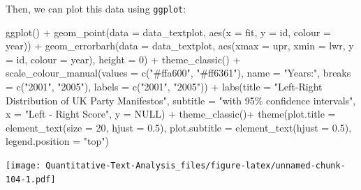 \documentclass[
]{book}
\newenvironment{Shaded}{\begin{snugshade}}{\end{snugshade}}
\newcommand{\AttributeTok}[1]{\textcolor[rgb]{0.77,0.63,0.00}{#1}}
\newcommand{\ConstantTok}[1]{\textcolor[rgb]{0.00,0.00,0.00}{#1}}
\newcommand{\DecValTok}[1]{\textcolor[rgb]{0.00,0.00,0.81}{#1}}
\newcommand{\FloatTok}[1]{\textcolor[rgb]{0.00,0.00,0.81}{#1}}
\newcommand{\FunctionTok}[1]{\textcolor[rgb]{0.00,0.00,0.00}{#1}}
\newcommand{\NormalTok}[1]{#1}
\newcommand{\SpecialCharTok}[1]{\textcolor[rgb]{0.00,0.00,0.00}{#1}}
\newcommand{\StringTok}[1]{\textcolor[rgb]{0.31,0.60,0.02}{#1}}
\begin{document}
Then, we can plot this data using \texttt{ggplot}:

\begin{Shaded}
\begin{Highlighting}[]
\FunctionTok{ggplot}\NormalTok{() }\SpecialCharTok{+}
  \FunctionTok{geom\_point}\NormalTok{(}\AttributeTok{data =}\NormalTok{ data\_textplot, }\FunctionTok{aes}\NormalTok{(}\AttributeTok{x =}\NormalTok{ fit, }\AttributeTok{y =}\NormalTok{ id, }\AttributeTok{colour =}\NormalTok{ year)) }\SpecialCharTok{+}
  \FunctionTok{geom\_errorbarh}\NormalTok{(}\AttributeTok{data =}\NormalTok{ data\_textplot, }\FunctionTok{aes}\NormalTok{(}\AttributeTok{xmax =}\NormalTok{ upr, }\AttributeTok{xmin =}\NormalTok{ lwr,  }\AttributeTok{y =}\NormalTok{ id, }\AttributeTok{colour =}\NormalTok{ year), }\AttributeTok{height =} \DecValTok{0}\NormalTok{) }\SpecialCharTok{+}
  \FunctionTok{theme\_classic}\NormalTok{() }\SpecialCharTok{+}
  \FunctionTok{scale\_colour\_manual}\NormalTok{(}\AttributeTok{values =} \FunctionTok{c}\NormalTok{(}\StringTok{"\#ffa600"}\NormalTok{, }\StringTok{"\#ff6361"}\NormalTok{),}
                      \AttributeTok{name =} \StringTok{"Years:"}\NormalTok{,}
                      \AttributeTok{breaks =} \FunctionTok{c}\NormalTok{(}\StringTok{"2001"}\NormalTok{, }\StringTok{"2005"}\NormalTok{),}
                      \AttributeTok{labels =} \FunctionTok{c}\NormalTok{(}\StringTok{"2001"}\NormalTok{, }\StringTok{"2005"}\NormalTok{)) }\SpecialCharTok{+}
  \FunctionTok{labs}\NormalTok{(}\AttributeTok{title =} \StringTok{"Left{-}Right Distribution of UK Party Manifestos"}\NormalTok{,}
       \AttributeTok{subtitle =} \StringTok{"with 95\% confidence intervals"}\NormalTok{,}
       \AttributeTok{x =} \StringTok{"Left {-} Right Score"}\NormalTok{,}
       \AttributeTok{y =} \ConstantTok{NULL}\NormalTok{) }\SpecialCharTok{+}
  \FunctionTok{theme\_classic}\NormalTok{()}\SpecialCharTok{+}
  \FunctionTok{theme}\NormalTok{(}\AttributeTok{plot.title =} \FunctionTok{element\_text}\NormalTok{(}\AttributeTok{size =} \DecValTok{20}\NormalTok{, }\AttributeTok{hjust =} \FloatTok{0.5}\NormalTok{),}
        \AttributeTok{plot.subtitle =} \FunctionTok{element\_text}\NormalTok{(}\AttributeTok{hjust =} \FloatTok{0.5}\NormalTok{),}
        \AttributeTok{legend.position =} \StringTok{"top"}\NormalTok{)}
\end{Highlighting}
\end{Shaded}

\texttt{[image: Quantitative-Text-Analysis\_files/figure-latex/unnamed-chunk-104-1.pdf]}
\end{document}
